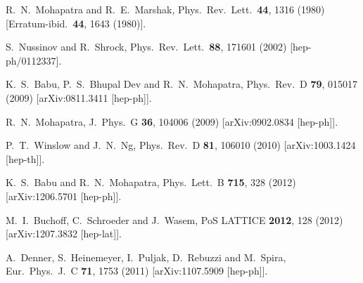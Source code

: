\begin{thebibliography}{99}
  R.~N.~Mohapatra and R.~E.~Marshak,
  Phys.\ Rev.\ Lett.\  {\bf 44}, 1316 (1980)
  [Erratum-ibid.\  {\bf 44}, 1643 (1980)].

  S.~Nussinov and R.~Shrock,
  Phys.\ Rev.\ Lett.\  {\bf 88}, 171601 (2002)
  [hep-ph/0112337].

  K.~S.~Babu, P.~S.~Bhupal Dev and R.~N.~Mohapatra,
  Phys.\ Rev.\ D {\bf 79}, 015017 (2009)
  [arXiv:0811.3411 [hep-ph]].

  R.~N.~Mohapatra,
  J.\ Phys.\ G {\bf 36}, 104006 (2009)
  [arXiv:0902.0834 [hep-ph]].

  P.~T.~Winslow and J.~N.~Ng,
  Phys.\ Rev.\ D {\bf 81}, 106010 (2010)
  [arXiv:1003.1424 [hep-th]].

  K.~S.~Babu and R.~N.~Mohapatra,
  Phys.\ Lett.\ B {\bf 715}, 328 (2012)
  [arXiv:1206.5701 [hep-ph]].

  M.~I.~Buchoff, C.~Schroeder and J.~Wasem,
  PoS LATTICE {\bf 2012}, 128 (2012)
  [arXiv:1207.3832 [hep-lat]].
  
  
  A.~Denner, S.~Heinemeyer, I.~Puljak, D.~Rebuzzi and M.~Spira,
  Eur.\ Phys.\ J.\ C {\bf 71}, 1753 (2011)
  [arXiv:1107.5909 [hep-ph]].
  

\end{thebibliography}
